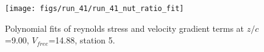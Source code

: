 \begin{figure}[H]
\centering
\texttt{[image: figs/run\_41/run\_41\_nut\_ratio\_fit]}
\caption{Polynomial fits of reynolds stress and velocity gradient terms at $z/c$=9.00, $V_{free}$=14.88, station 5.}
\label{fig:run_41_nut_ratio_fit}
\end{figure}



